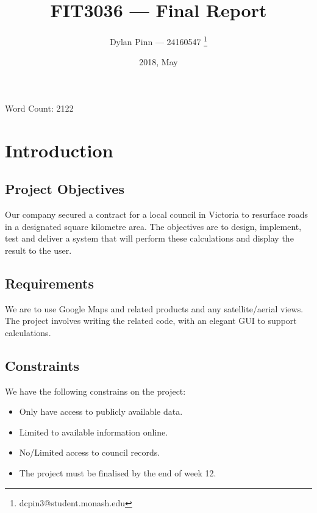 \documentclass[a4paper,11pt]{article}
\title{FIT3036 --- Final Report}
\author{Dylan Pinn --- 24160547 \thanks{dcpin3@student.monash.edu}}
\date{2018, May}
\begin{document}
\maketitle
\vspace{-1ex}
\begin{center}
  Word Count: 2122
\end{center}

\begin{abstract}
\end{abstract}
\pagebreak

\tableofcontents
\pagebreak

\section{Introduction}

\subsection{Project Objectives}

Our company secured a contract for a local council in Victoria to resurface
roads in a designated square kilometre area. The objectives are to design,
implement, test and deliver a system that will perform these calculations and
display the result to the user.

\subsection{Requirements}

We are to use Google Maps and related products and any satellite/aerial views.
The project involves writing the related code, with an elegant GUI to support
calculations. \autocite[2]{intro:1}

\subsection{Constraints}

We have the following constrains on the project:

\begin{itemize}
  \item Only have access to publicly available data.
  \item Limited to available information online.
  \item No/Limited access to council records.
  \item The project must be finalised by the end of week 12.
\end{itemize}
\end{document}
